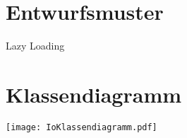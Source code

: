 \section{Entwurfsmuster}
Lazy Loading

\section{Klassendiagramm}
\texttt{[image: IoKlassendiagramm.pdf]}
